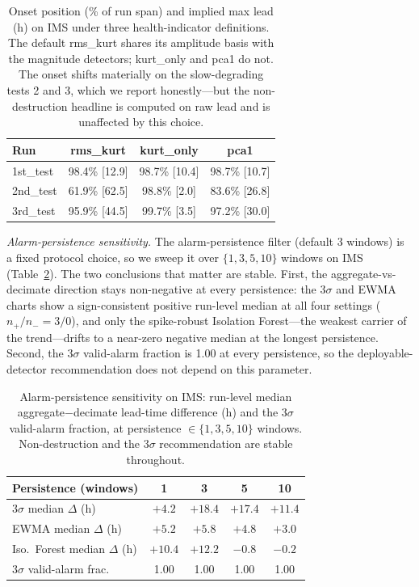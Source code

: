 \documentclass[IJPHM, 2026, 0]{PHMSociety}
\begin{document}
\begin{table}[t] \small
	\begin{center}
	\caption{Onset position (\% of run span) and implied max lead (h) on IMS under three health-indicator definitions. The default rms\_kurt shares its amplitude basis with the magnitude detectors; kurt\_only and pca1 do not. The onset shifts materially on the slow-degrading tests 2 and 3, which we report honestly---but the non-destruction headline is computed on raw lead and is unaffected by this choice.}
	\label{tab:decoupled}
	\begin{tabular}{l c c c}
		\hline \hline
		\textbf{Run} & \textbf{rms\_kurt} & \textbf{kurt\_only} & \textbf{pca1} \\
		\hline
		1st\_test & 98.4\% [12.9] & 98.7\% [10.4] & 98.7\% [10.7] \\
		2nd\_test & 61.9\% [62.5] & 98.8\% [2.0] & 83.6\% [26.8] \\
		3rd\_test & 95.9\% [44.5] & 99.7\% [3.5] & 97.2\% [30.0] \\
		\hline \hline
	\end{tabular}
	\end{center}
\end{table}

\emph{Alarm-persistence sensitivity.} The alarm-persistence filter (default 3 windows) is a fixed protocol choice, so we sweep it over $\{1,3,5,10\}$ windows on IMS (Table~\ref{tab:persistence}). The two conclusions that matter are stable. First, the aggregate-vs-decimate direction stays non-negative at every persistence: the $3\sigma$ and EWMA charts show a sign-consistent positive run-level median at all four settings ($n_+/n_-=3/0$), and only the spike-robust Isolation Forest---the weakest carrier of the trend---drifts to a near-zero negative median at the longest persistence. Second, the $3\sigma$ valid-alarm fraction is 1.00 at every persistence, so the deployable-detector recommendation does not depend on this parameter.

\begin{table}[t] \small
	\begin{center}
	\caption{Alarm-persistence sensitivity on IMS: run-level median aggregate$-$decimate lead-time difference (h) and the $3\sigma$ valid-alarm fraction, at persistence $\in \{1,3,5,10\}$ windows. Non-destruction and the $3\sigma$ recommendation are stable throughout.}
	\label{tab:persistence}
	\begin{tabular}{l c c c c}
		\hline \hline
		\textbf{Persistence (windows)} & \textbf{1} & \textbf{3} & \textbf{5} & \textbf{10} \\
		\hline
		$3\sigma$ median $\Delta$ (h) & $+4.2$ & $+18.4$ & $+17.4$ & $+11.4$ \\
		EWMA median $\Delta$ (h) & $+5.2$ & $+5.8$ & $+4.8$ & $+3.0$ \\
		Iso.\ Forest median $\Delta$ (h) & $+10.4$ & $+12.2$ & $-0.8$ & $-0.2$ \\
		$3\sigma$ valid-alarm frac. & 1.00 & 1.00 & 1.00 & 1.00 \\
		\hline \hline
	\end{tabular}
	\end{center}
\end{table}
\end{document}

